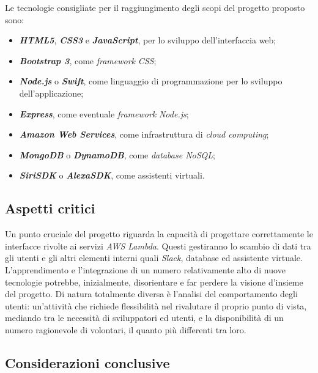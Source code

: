Le tecnologie consigliate per il raggiungimento degli scopi del progetto proposto sono:
\begin{itemize}
	\item \textbf{\textit{HTML5}}, \textbf{\textit{CSS3}} e \textbf{\textit{JavaScript}}, per lo sviluppo dell'interfaccia web;
	\item \textbf{\textit{Bootstrap 3}}, come \textit{framework} \textit{CSS};
	\item \textbf{\textit{Node.js}} o \textbf{\textit{Swift}}, come linguaggio di programmazione per lo
	sviluppo dell'applicazione;
	\item \textbf{\textit{Express}}, come eventuale \textit{framework} \textit{Node.js};
	\item \textbf{\textit{Amazon Web Services}}, come infrastruttura di \textit{cloud computing};
	\item \textbf{\textit{MongoDB}} o \textbf{\textit{DynamoDB}}, come \textit{database NoSQL};
	\item \textbf{\textit{SiriSDK}} o \textbf{\textit{AlexaSDK}}, come assistenti virtuali.
\end{itemize}

\subsection{Aspetti critici}

Un punto cruciale del progetto riguarda la capacità di progettare
correttamente le interfacce rivolte ai servizi \textit{AWS Lambda}. Questi gestiranno lo scambio di dati tra gli utenti e gli altri elementi
interni quali \textit{Slack}, database ed assistente virtuale. L'apprendimento e l'integrazione di un numero relativamente alto di nuove tecnologie potrebbe, inizialmente, disorientare e far perdere la visione d'insieme del progetto.
Di natura totalmente diversa è l'analisi del comportamento degli
utenti: un'attività che richiede flessibilità nel rivalutare il proprio
punto di vista, mediando tra le necessità di sviluppatori ed utenti,
e la disponibilità di un numero ragionevole di volontari, il quanto più differenti tra loro.

\subsection{Considerazioni conclusive}

